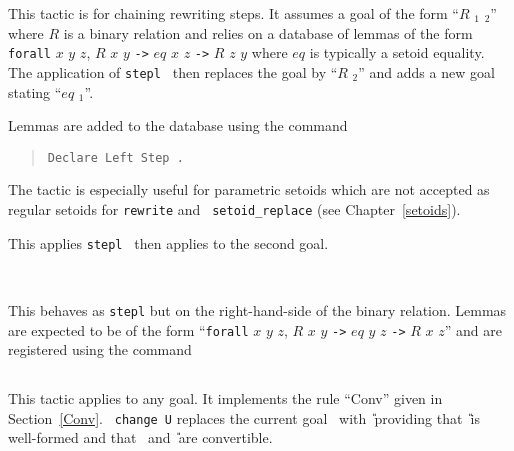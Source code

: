 This tactic is for chaining rewriting steps. It assumes a goal of the
form ``$R$ {\term}$_1$ {\term}$_2$'' where $R$ is a binary relation
and relies on a database of lemmas of the form {\tt forall} $x$ $y$
$z$, $R$ $x$ $y$ {\tt ->} $eq$ $x$ $z$ {\tt ->} $R$ $z$ $y$ where $eq$
is typically a setoid equality. The application of {\tt stepl {\term}}
then replaces the goal by ``$R$ {\term} {\term}$_2$'' and adds a new
goal stating ``$eq$ {\term} {\term}$_1$''.

Lemmas are added to the database using the command
\begin{quote}
{\tt Declare Left Step {\term}.}
\end{quote}

The tactic is especially useful for parametric setoids which are not
accepted as regular setoids for {\tt rewrite} and {\tt
  setoid\_replace} (see Chapter~\ref{setoids}).

\begin{Variants}
\item{}

This applies {\tt stepl {\term}} then applies {\tac} to the second goal.

\item{}\\
     {}

This behaves as {\tt stepl} but on the right-hand-side of the binary relation.
Lemmas are expected to be of the form
``{\tt forall} $x$ $y$
$z$, $R$ $x$ $y$ {\tt ->} $eq$ $y$ $z$ {\tt ->} $R$ $x$ $z$''
and are registered using the command
\begin{quote}
{}
\end{quote}
\end{Variants}

\subsection{}
\label{change}

This tactic applies to any goal. It implements the rule
``Conv'' given in Section~\ref{Conv}.  {\tt
  change U} replaces the current goal \T\ with \U\ providing that
\U\ is well-formed and that \T\ and \U\ are convertible.

\begin{ErrMsgs}
\item {}
\end{ErrMsgs}

